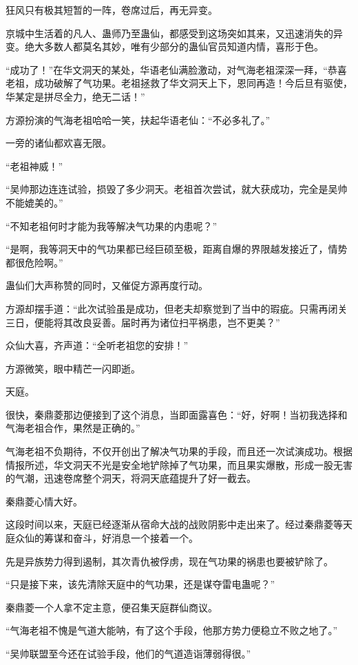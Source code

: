 \begin{this_body}
狂风只有极其短暂的一阵，卷席过后，再无异变。

京城中生活着的凡人、蛊师乃至蛊仙，都感受到这场突如其来，又迅速消失的异变。绝大多数人都莫名其妙，唯有少部分的蛊仙官员知道内情，喜形于色。

“成功了！”在华文洞天的某处，华语老仙满脸激动，对气海老祖深深一拜，“恭喜老祖，成功破解了气功果。老祖拯救了华文洞天上下，恩同再造！今后旦有驱使，华某定是拼尽全力，绝无二话！”

方源扮演的气海老祖哈哈一笑，扶起华语老仙：“不必多礼了。”

一旁的诸仙都欢喜无限。

“老祖神威！”

“吴帅那边连连试验，损毁了多少洞天。老祖首次尝试，就大获成功，完全是吴帅不能媲美的。”

“不知老祖何时才能为我等解决气功果的内患呢？”

“是啊，我等洞天中的气功果都已经巨硕至极，距离自爆的界限越发接近了，情势都很危险啊。”

蛊仙们大声称赞的同时，又催促方源再度行动。

方源却摆手道：“此次试验虽是成功，但老夫却察觉到了当中的瑕疵。只需再闭关三日，便能将其改良妥善。届时再为诸位扫平祸患，岂不更美？”

众仙大喜，齐声道：“全听老祖您的安排！”

方源微笑，眼中精芒一闪即逝。

天庭。

很快，秦鼎菱那边便接到了这个消息，当即面露喜色：“好，好啊！当初我选择和气海老祖合作，果然是正确的。”

气海老祖不负期待，不仅开创出了解决气功果的手段，而且还一次试演成功。根据情报所述，华文洞天不光是安全地铲除掉了气功果，而且果实爆散，形成一股无害的气潮，迅速卷席整个洞天，将洞天底蕴提升了好一截去。

秦鼎菱心情大好。

这段时间以来，天庭已经逐渐从宿命大战的战败阴影中走出来了。经过秦鼎菱等天庭众仙的筹谋和奋斗，好消息一个接着一个。

先是异族势力得到遏制，其次青仇被俘虏，现在气功果的祸患也要被铲除了。

“只是接下来，该先清除天庭中的气功果，还是谋夺雷电蛊呢？”

秦鼎菱一个人拿不定主意，便召集天庭群仙商议。

“气海老祖不愧是气道大能呐，有了这个手段，他那方势力便稳立不败之地了。”

“吴帅联盟至今还在试验手段，他们的气道造诣薄弱得很。”


\end{this_body}
